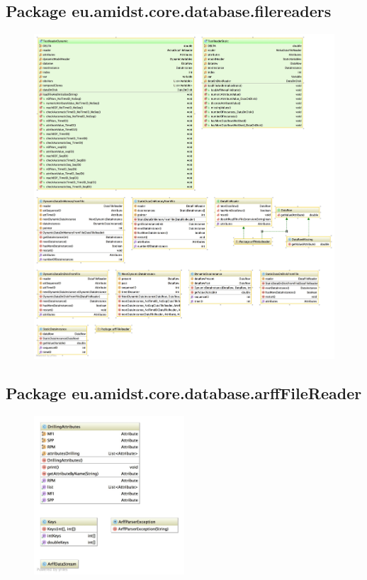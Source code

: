 \subsection{Package eu.amidst.core.database.filereaders}
\begin{figure}[H]
  \centering
    \includegraphics[width=\textwidth]{ClassDiagrams/core_database_filereaders.jpg}
\end{figure}

\subsection{Package eu.amidst.core.database.arffFileReader}

\begin{figure}[H]
  \centering
    \includegraphics[width=0.5\textwidth]{ClassDiagrams/core_database_filereaders_arfffilereader.jpg}
\end{figure}

